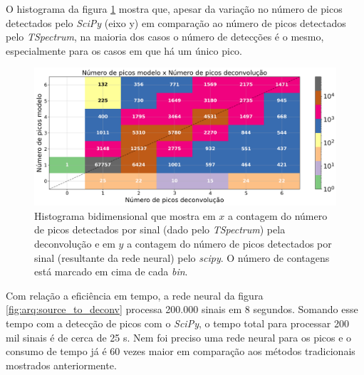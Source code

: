 \documentclass[a4paper,12pt,oneside]{book}
\begin{document}
\par O histograma da figura \ref{fig:hist_2d_peaks} mostra que, apesar da variação no número de picos detectados pelo \textit{SciPy} (eixo y) em comparação ao número de picos detectados pelo \textit{TSpectrum}, na maioria dos casos o número de detecções é o mesmo, especialmente para os casos em que há um único pico.

\begin{figure}[H]
    \centering
    \includegraphics[scale = 0.48]{figs/hitograma_2d_peaks.png}
    \caption{Histograma bidimensional que mostra em $x$ a contagem do número de picos detectados por sinal (dado pelo \textit{TSpectrum}) pela deconvolução e em $y$ a contagem do número de picos detectados por sinal (resultante da rede neural) pelo \textit{scipy}. O número de contagens está marcado em cima de cada \textit{bin}.}
    \label{fig:hist_2d_peaks}
\end{figure}

\par Com relação a eficiência em tempo, a rede neural da figura \ref{fig:arq:source_to_deconv} processa 200.000 sinais em 8 segundos. Somando esse tempo com a detecção de picos com o \textit{SciPy}, o tempo total para processar 200 mil sinais é de cerca de 25 s. Nem foi preciso uma rede neural para os picos e o consumo de tempo já é 60 vezes maior em comparação aos métodos tradicionais mostrados anteriormente.
\end{document}
